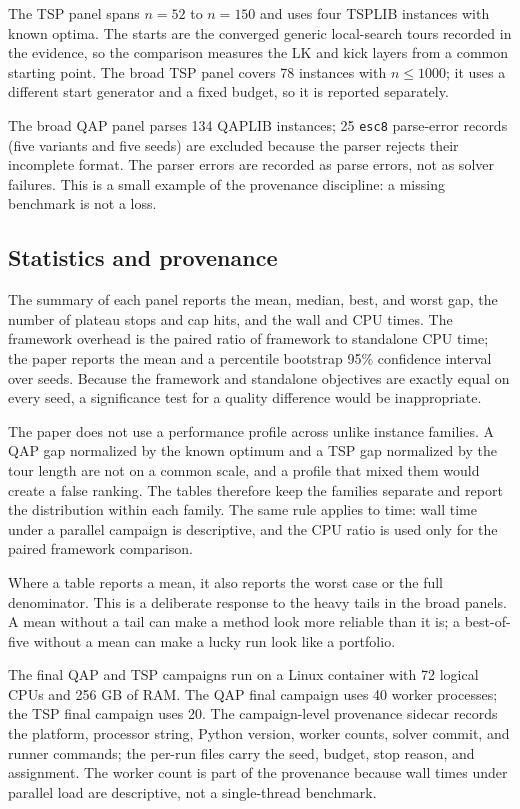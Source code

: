 \documentclass[pdflatex,sn-mathphys-num]{sn-jnl}
\begin{document}
The TSP panel spans $n=52$ to $n=150$ and uses four TSPLIB instances with known optima. The starts are
the converged generic local-search tours recorded in the evidence, so the comparison measures the LK and kick layers
from a common starting point. The broad TSP panel covers 78 instances with $n\le1000$; it uses a
different start generator and a fixed budget, so it is reported separately.

The broad QAP panel parses 134 QAPLIB instances; 25 \texttt{esc8} parse-error records (five variants and five seeds) are excluded because the
parser rejects their incomplete format. The parser errors are recorded as parse errors, not as solver
failures. This is a small example of the provenance discipline: a missing benchmark is not a loss.

\subsection{Statistics and provenance}

The summary of each panel reports the mean, median, best, and worst gap, the number of plateau stops
and cap hits, and the wall and CPU times. The framework overhead is the paired ratio of framework to
standalone CPU time; the paper reports the mean and a percentile bootstrap 95\% confidence interval
over seeds. Because the framework and standalone objectives are exactly equal on every seed, a
significance test for a quality difference would be inappropriate.

The paper does not use a performance profile across unlike instance families. A QAP gap normalized by
the known optimum and a TSP gap normalized by the tour length are not on a common scale, and a
profile that mixed them would create a false ranking. The tables therefore keep the families separate
and report the distribution within each family. The same rule applies to time: wall time under a
parallel campaign is descriptive, and the CPU ratio is used only for the paired framework comparison.

Where a table reports a mean, it also reports the worst case or the full denominator. This is a
deliberate response to the heavy tails in the broad panels. A mean without a tail can make a method
look more reliable than it is; a best-of-five without a mean can make a lucky run look like a
portfolio.

The final QAP and TSP campaigns run on a Linux container with 72 logical CPUs and 256 GB of RAM. The
QAP final campaign uses 40 worker processes; the TSP final campaign uses 20. The campaign-level
provenance sidecar records the platform, processor string, Python version, worker counts, solver
commit, and runner commands; the per-run files carry the seed, budget, stop reason, and assignment.
The worker count is part of the provenance because wall times under parallel load are descriptive,
not a single-thread benchmark.
\end{document}
